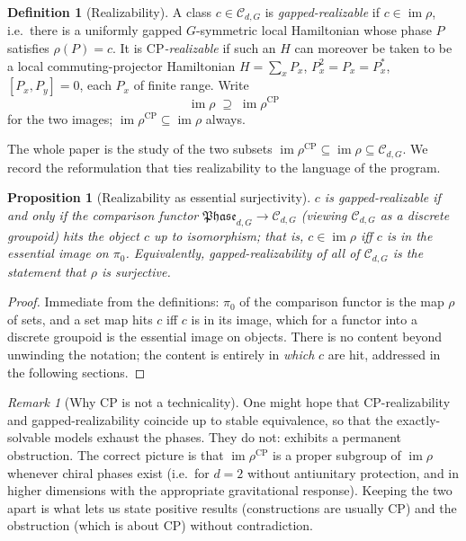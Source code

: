 \documentclass[12pt]{article}
\newcommand{\Phase}{\mathfrak{Phase}}          %
\newcommand{\real}{\rho}                         %
\newcommand{\CP}{\mathrm{CP}}                    %
\newcommand{\im}{\operatorname{im}}
\newtheorem{proposition}[theorem]{Proposition}
\theoremstyle{definition}
\newtheorem{definition}[theorem]{Definition}
\theoremstyle{remark}
\newtheorem{remark}[theorem]{Remark}
\begin{document}
\begin{definition}[Realizability]
\label{def:realizable}
A class $c\in\mathcal{C}_{d,G}$ is \emph{gapped-realizable} if $c\in\im\real$, i.e.\ there is
a uniformly gapped $G$-symmetric local Hamiltonian whose phase $P$ satisfies $\real(P)=c$. It
is \emph{$\CP$-realizable} if such an $H$ can moreover be taken to be a local
commuting-projector Hamiltonian $H=\sum_x P_x$, $P_x^2=P_x=P_x^\ast$, $[P_x,P_y]=0$, each
$P_x$ of finite range. Write
\[
  \im\real \;\supseteq\; \im\real^{\CP}
\]
for the two images; $\im\real^{\CP}\subseteq\im\real$ always.
\end{definition}

The whole paper is the study of the two subsets $\im\real^{\CP}\subseteq\im\real\subseteq
\mathcal{C}_{d,G}$. We record the reformulation that ties realizability to the language of
the program.

\begin{proposition}[Realizability as essential surjectivity]
\label{prop:esssurj}
$c$ is gapped-realizable if and only if the comparison functor
$\Phase_{d,G}\to\mathcal{C}_{d,G}$ (viewing $\mathcal{C}_{d,G}$ as a discrete groupoid) hits
the object $c$ up to isomorphism; that is, $c\in\im\real$ iff $c$ is in the essential image
on $\pi_0$. Equivalently, gapped-realizability of all of $\mathcal{C}_{d,G}$ is the
statement that $\real$ is surjective.
\end{proposition}

\begin{proof}
Immediate from the definitions: $\pi_0$ of the comparison functor is the map $\real$ of
sets, and a set map hits $c$ iff $c$ is in its image, which for a functor into a discrete
groupoid is the essential image on objects. There is no content beyond unwinding the
notation; the content is entirely in \emph{which} $c$ are hit, addressed in the following
sections.
\end{proof}

\begin{remark}[Why $\CP$ is not a technicality]
\label{rem:cp}
One might hope that $\CP$-realizability and gapped-realizability coincide up to stable
equivalence, so that the exactly-solvable models exhaust the phases. They do not:
 exhibits a permanent obstruction. The correct picture is that
$\im\real^{\CP}$ is a proper subgroup of $\im\real$ whenever chiral phases exist (i.e.\ for
$d=2$ without antiunitary protection, and in higher dimensions with the appropriate
gravitational response). Keeping the two apart is what lets us state positive results
(constructions are usually $\CP$) and the obstruction (which is about $\CP$) without
contradiction.
\end{remark}
\end{document}
